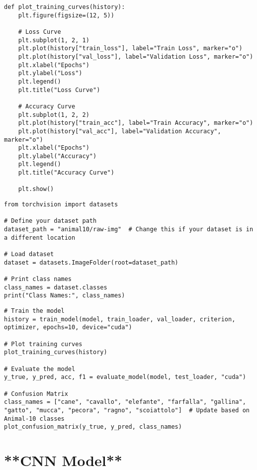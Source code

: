 \documentclass{article}
\begin{document}
\begin{verbatim}
def plot_training_curves(history):
    plt.figure(figsize=(12, 5))

    # Loss Curve
    plt.subplot(1, 2, 1)
    plt.plot(history["train_loss"], label="Train Loss", marker="o")
    plt.plot(history["val_loss"], label="Validation Loss", marker="o")
    plt.xlabel("Epochs")
    plt.ylabel("Loss")
    plt.legend()
    plt.title("Loss Curve")

    # Accuracy Curve
    plt.subplot(1, 2, 2)
    plt.plot(history["train_acc"], label="Train Accuracy", marker="o")
    plt.plot(history["val_acc"], label="Validation Accuracy", marker="o")
    plt.xlabel("Epochs")
    plt.ylabel("Accuracy")
    plt.legend()
    plt.title("Accuracy Curve")

    plt.show()

\end{verbatim}

\begin{verbatim}
from torchvision import datasets

# Define your dataset path
dataset_path = "animal10/raw-img"  # Change this if your dataset is in a different location

# Load dataset
dataset = datasets.ImageFolder(root=dataset_path)

# Print class names
class_names = dataset.classes
print("Class Names:", class_names)

\end{verbatim}

\begin{verbatim}
# Train the model
history = train_model(model, train_loader, val_loader, criterion, optimizer, epochs=10, device="cuda")

# Plot training curves
plot_training_curves(history)

# Evaluate the model
y_true, y_pred, acc, f1 = evaluate_model(model, test_loader, "cuda")

# Confusion Matrix
class_names = ["cane", "cavallo", "elefante", "farfalla", "gallina", "gatto", "mucca", "pecora", "ragno", "scoiattolo"]  # Update based on Animal-10 classes
plot_confusion_matrix(y_true, y_pred, class_names)

\end{verbatim}

\section{**CNN Model**}
\end{document}
